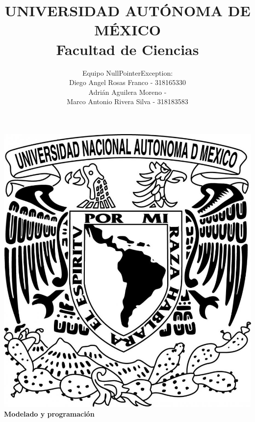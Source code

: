 \title{UNIVERSIDAD AUT\'ONOMA DE M\'EXICO\\ Facultad de Ciencias}
\author{Equipo NullPointerException:\\
  Diego Angel Rosas Franco   - 318165330 \\
  Adri\'an Aguilera Moreno   - \\
  Marco Antonio Rivera Silva - 318183583}
\date{}
\maketitle
\begin{center}
  \includegraphics[scale=0.20]{../Imagen/Portada.jpg}\\[0.4cm]
  \Large
  \bf{Modelado y programación}
  \normalsize
\end{center}
\newpage
{}

